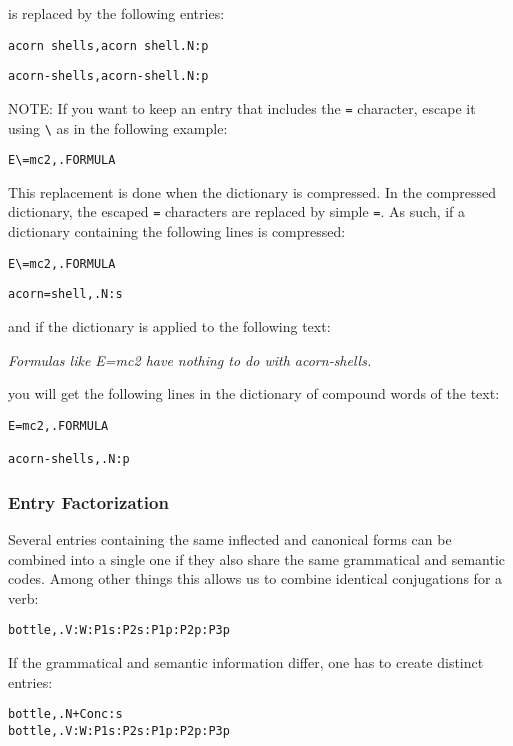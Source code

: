 \bigskip
\noindent is replaced by the following entries:

\bigskip
\verb$acorn shells,acorn shell.N:p$

\verb$acorn-shells,acorn-shell.N:p$

\bigskip
\noindent NOTE: If you want to keep an entry that includes the \verb+=+
character, escape it using \verb+\+ as in the following example:

\bigskip \verb$E\=mc2,.FORMULA$

\bigskip
\noindent This replacement is done when the dictionary is compressed. In the compressed
dictionary, the escaped \verb+=+ characters are replaced by simple \verb+=+. As
such, if a dictionary containing the following lines is compressed:


\bigskip
\verb$E\=mc2,.FORMULA$

\bigskip
\verb$acorn=shell,.N:s$

\bigskip
\noindent and if the dictionary is applied to the following text:

\bigskip
\textit{Formulas like E=mc2 have nothing to do with acorn-shells.}

\bigskip \noindent you will get the following lines in the dictionary of compound
words of the text:


\begin{verbatim}
E=mc2,.FORMULA

acorn-shells,.N:p
\end{verbatim}


\subsubsection{Entry Factorization}

Several entries containing the same inflected and canonical forms can be
combined into a single one if they also share the same grammatical and semantic
codes. Among other things this allows us to combine identical conjugations for a verb:

\bigskip
\begin{verbatim}
bottle,.V:W:P1s:P2s:P1p:P2p:P3p
\end{verbatim}

\bigskip 
\noindent If the grammatical and semantic information differ, one has to create
distinct entries:

\bigskip
\begin{verbatim}
bottle,.N+Conc:s
bottle,.V:W:P1s:P2s:P1p:P2p:P3p
\end{verbatim}

